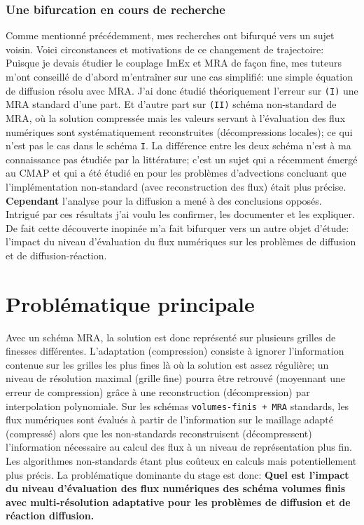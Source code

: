     \subsubsection{Une bifurcation en cours de recherche}
        Comme mentionné précédemment, mes recherches ont bifurqué vers un sujet voisin. Voici circonstances et motivations de ce changement de trajectoire:
        Puisque je devais étudier le couplage ImEx et MRA de façon fine, mes tuteurs m'ont conseillé 
        de d'abord m’entraîner sur une cas simplifié: une simple équation de diffusion résolu avec MRA.
        J'ai donc étudié théoriquement l'erreur sur \texttt{(I)} une MRA standard d'une part. Et d'autre part sur \texttt{(II)} schéma non-standard de MRA, où la solution compressée mais les valeurs servant à l'évaluation des flux numériques sont systématiquement reconstruites (décompressions locales); ce qui n'est pas le cas dans le schéma \texttt{I}.
        La différence entre les deux schéma n'est à ma connaissance pas étudiée par la littérature;
        c'est un sujet qui a récemment émergé au CMAP et qui a été étudié en \cite{belloti_et_al_2025} pour les problèmes d’advections 
        concluant que l'implémentation non-standard (avec reconstruction des flux) était plus précise.
        \textbf{Cependant} l'analyse pour la diffusion a mené à des conclusions opposés.
        Intrigué par ces résultats j'ai voulu les confirmer, les documenter et les expliquer.
        De fait cette découverte inopinée m'a fait bifurquer vers un autre objet d'étude: 
        l'impact du niveau d'évaluation du flux numériques sur les problèmes de diffusion et de diffusion-réaction.
    \newpage
    \section{Problématique principale}
    Avec un schéma MRA, la solution est donc représenté sur plusieurs grilles de finesses différentes.
    L'adaptation (compression) consiste à ignorer l'information contenue sur les grilles les plus fines là où la solution est assez régulière;
    un niveau de résolution maximal (grille fine) pourra être retrouvé (moyennant une erreur de compression) grâce à une reconstruction (décompression) par 
    interpolation polynomiale.
    Sur les schémas \texttt{volumes-finis + MRA} standards, les flux numériques sont évalués à partir de l'information sur le maillage adapté (compressé) alors
    que les non-standards reconstruisent (décompressent) l'information nécessaire au calcul des flux à un niveau de représentation plus fin. Les algorithmes non-standards 
    étant plus coûteux en calculs mais potentiellement plus précis.
    La problématique dominante du stage est donc: \textbf{Quel est l'impact du niveau d'évaluation des flux numériques des schéma volumes finis avec multi-résolution adaptative
    pour les problèmes de diffusion et de réaction diffusion.}
